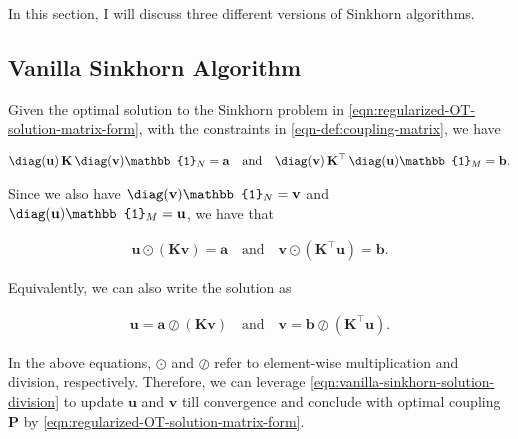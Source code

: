 
In this section, I will discuss three different versions of Sinkhorn algorithms.

\subsection{Vanilla Sinkhorn Algorithm}\label{subsec:vanilla-sinkhorn}

Given the optimal solution to the Sinkhorn problem in \cref{eqn:regularized-OT-solution-matrix-form},
with the constraints in \cref{eqn-def:coupling-matrix}, we have

\begin{equation}
  \begin{aligned}
    \diag(\mathbf{u}) \,  \mathbf{K}      \, \diag(\mathbf{v}) \mathbb{1}_N  = \mathbf{a}
    \quad\text{and}\quad
    \diag(\mathbf{v}) \,  \mathbf{K}^\top \, \diag(\mathbf{u}) \mathbb{1}_M  = \mathbf{b}.
  \end{aligned}
\end{equation}

Since we also have $\diag(\mathbf{v}) \mathbb{1}_N = \mathbf{v}$ and $\diag(\mathbf{u}) \mathbb{1}_M = \mathbf{u}$,
we have that

\begin{equation}\label{eqn:vanilla-sinkhorn-solution-multiply}
  \begin{aligned}
    \mathbf{u} \odot (\mathbf{K} \mathbf{v}) = \mathbf{a}
    \quad\text{and}\quad
    \mathbf{v} \odot (\mathbf{K}^\top \mathbf{u}) = \mathbf{b}.
  \end{aligned}
\end{equation}

Equivalently, we can also write the solution as

\begin{equation}\label{eqn:vanilla-sinkhorn-solution-division}
  \begin{aligned}
    \mathbf{u} = \mathbf{a} \oslash (\mathbf{K} \mathbf{v})
    \quad\text{and}\quad
    \mathbf{v} = \mathbf{b} \oslash (\mathbf{K}^\top \mathbf{u}).
  \end{aligned}
\end{equation}

In the above equations, $\odot$ and $\oslash$ refer to element-wise multiplication and division, respectively.
Therefore, we can leverage \cref{eqn:vanilla-sinkhorn-solution-division} to update $\mathbf{u}$ and $\mathbf{v}$
till convergence and conclude with optimal coupling $\mathbf{P}$ by \cref{eqn:regularized-OT-solution-matrix-form}.



